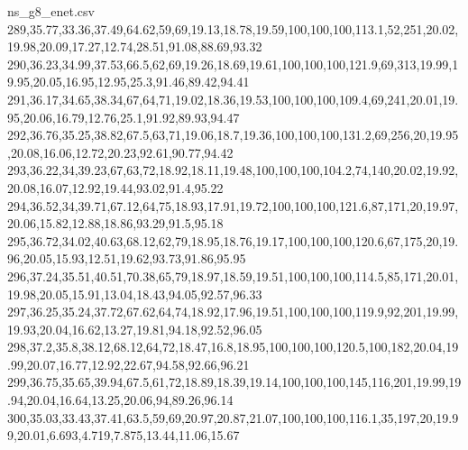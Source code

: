 \begin{filecontents*}[overwrite]{ns_g8_enet.csv}
289,35.77,33.36,37.49,64.62,59,69,19.13,18.78,19.59,100,100,100,113.1,52,251,20.02,19.98,20.09,17.27,12.74,28.51,91.08,88.69,93.32
290,36.23,34.99,37.53,66.5,62,69,19.26,18.69,19.61,100,100,100,121.9,69,313,19.99,19.95,20.05,16.95,12.95,25.3,91.46,89.42,94.41
291,36.17,34.65,38.34,67,64,71,19.02,18.36,19.53,100,100,100,109.4,69,241,20.01,19.95,20.06,16.79,12.76,25.1,91.92,89.93,94.47
292,36.76,35.25,38.82,67.5,63,71,19.06,18.7,19.36,100,100,100,131.2,69,256,20,19.95,20.08,16.06,12.72,20.23,92.61,90.77,94.42
293,36.22,34,39.23,67,63,72,18.92,18.11,19.48,100,100,100,104.2,74,140,20.02,19.92,20.08,16.07,12.92,19.44,93.02,91.4,95.22
294,36.52,34,39.71,67.12,64,75,18.93,17.91,19.72,100,100,100,121.6,87,171,20,19.97,20.06,15.82,12.88,18.86,93.29,91.5,95.18
295,36.72,34.02,40.63,68.12,62,79,18.95,18.76,19.17,100,100,100,120.6,67,175,20,19.96,20.05,15.93,12.51,19.62,93.73,91.86,95.95
296,37.24,35.51,40.51,70.38,65,79,18.97,18.59,19.51,100,100,100,114.5,85,171,20.01,19.98,20.05,15.91,13.04,18.43,94.05,92.57,96.33
297,36.25,35.24,37.72,67.62,64,74,18.92,17.96,19.51,100,100,100,119.9,92,201,19.99,19.93,20.04,16.62,13.27,19.81,94.18,92.52,96.05
298,37.2,35.8,38.12,68.12,64,72,18.47,16.8,18.95,100,100,100,120.5,100,182,20.04,19.99,20.07,16.77,12.92,22.67,94.58,92.66,96.21
299,36.75,35.65,39.94,67.5,61,72,18.89,18.39,19.14,100,100,100,145,116,201,19.99,19.94,20.04,16.64,13.25,20.06,94,89.26,96.14
300,35.03,33.43,37.41,63.5,59,69,20.97,20.87,21.07,100,100,100,116.1,35,197,20,19.99,20.01,6.693,4.719,7.875,13.44,11.06,15.67
\end{filecontents*}

